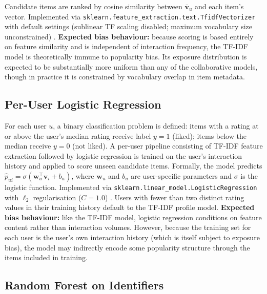 \documentclass[11pt,a4paper]{report}
\begin{document}
Candidate items are ranked by cosine similarity between $\bar{\mathbf{v}}_u$ and each item's vector. Implemented via \texttt{sklearn.feature\_extraction.text.TfidfVectorizer} with default settings (sublinear TF scaling disabled; maximum vocabulary size unconstrained) \citep{pedregosa2011scikit}. \textbf{Expected bias behaviour:} because scoring is based entirely on feature similarity and is independent of interaction frequency, the TF-IDF model is theoretically immune to popularity bias. Its exposure distribution is expected to be substantially more uniform than any of the collaborative models, though in practice it is constrained by vocabulary overlap in item metadata.

\subsection*{Per-User Logistic Regression}

For each user $u$, a binary classification problem is defined: items with a rating at or above the user's median rating receive label $y = 1$ (liked); items below the median receive $y = 0$ (not liked). A per-user pipeline consisting of TF-IDF feature extraction followed by logistic regression is trained on the user's interaction history and applied to score unseen candidate items. Formally, the model predicts $\hat{p}_{ui} = \sigma(\mathbf{w}_u^\top \mathbf{v}_i + b_u)$, where $\mathbf{w}_u$ and $b_u$ are user-specific parameters and $\sigma$ is the logistic function. Implemented via \texttt{sklearn.linear\_model.LogisticRegression} with $\ell_2$ regularisation ($C = 1.0$) \citep{pedregosa2011scikit}. Users with fewer than two distinct rating values in their training history default to the TF-IDF profile model. \textbf{Expected bias behaviour:} like the TF-IDF model, logistic regression conditions on feature content rather than interaction volumes. However, because the training set for each user is the user's own interaction history (which is itself subject to exposure bias), the model may indirectly encode some popularity structure through the items included in training.

\subsection*{Random Forest on Identifiers}
\end{document}
